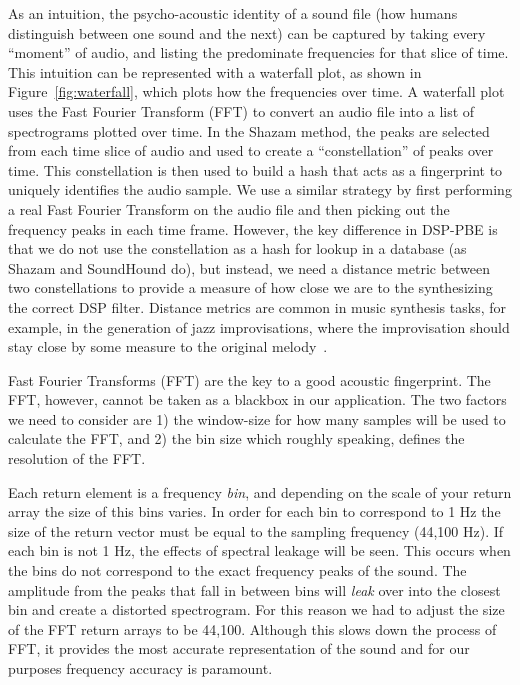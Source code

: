 As an intuition, the psycho-acoustic identity of a sound file (how humans distinguish between one sound and the next) can be captured by taking every ``moment'' of audio, and listing the predominate frequencies for that slice of time.
This intuition can be represented with a waterfall plot, as shown in Figure~\ref{fig:waterfall}, which plots how the frequencies over time.
A waterfall plot uses the Fast Fourier Transform (FFT) to convert an audio file into a list of spectrograms plotted over time.
In the Shazam method, the peaks are selected from each time slice of audio and used to create a ``constellation'' of peaks over time. 
This constellation is then used to build a hash that acts as a fingerprint to uniquely identifies the audio sample.
We use a similar strategy by first performing a real Fast Fourier Transform on the audio file and then picking out the frequency peaks in each time frame.
However, the key difference in DSP-PBE is that we do not use the constellation as a hash for lookup in a database (as Shazam and SoundHound do), but instead, we need a distance metric between two constellations to provide a measure of how close we are to the synthesizing the correct DSP filter.
Distance metrics are common in music synthesis tasks, for example, in the generation of jazz improvisations, where the improvisation should stay close by some measure to the original melody~\cite{donze2014machine}.

Fast Fourier Transforms (FFT) are the key to a good acoustic fingerprint.
The FFT, however, cannot be taken as a blackbox in our application.
The two factors we need to consider are 1) the window-size for how many samples will be used to calculate the FFT, and 2) the bin size which roughly speaking, defines the resolution of the FFT.

Each return element is a frequency \textit{bin}, and depending on the scale of your return array the size of this bins varies.
In order for each bin to correspond to 1 Hz the size of the return vector must be equal to the sampling frequency (44,100 Hz).
If each bin is not 1 Hz, the effects of spectral leakage will be seen.
This occurs when the bins do not correspond to the exact frequency peaks of the sound.
The amplitude from the peaks that fall in between bins will \textit{leak} over into the closest bin and create a distorted spectrogram.
For this reason we had to adjust the size of the FFT return arrays to be 44,100.
Although this slows down the process of FFT, it provides the most accurate representation of the sound and for our purposes frequency accuracy is paramount.

